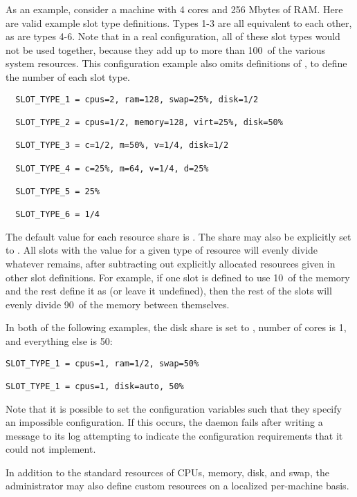 \begin{description}
As an example, consider a
machine with 4 cores and 256 Mbytes of RAM.
Here are valid example slot type definitions. 
Types 1-3 are all equivalent to each other, as are types 4-6.  Note that
in a real configuration, all of these slot types would not
be used together,
because they add up to more than 100\Percent\ of the various system resources.
This configuration example also omits definitions of
, to define the number of each slot type.

\begin{verbatim}
  SLOT_TYPE_1 = cpus=2, ram=128, swap=25%, disk=1/2

  SLOT_TYPE_2 = cpus=1/2, memory=128, virt=25%, disk=50%

  SLOT_TYPE_3 = c=1/2, m=50%, v=1/4, disk=1/2

  SLOT_TYPE_4 = c=25%, m=64, v=1/4, d=25%

  SLOT_TYPE_5 = 25%

  SLOT_TYPE_6 = 1/4
\end{verbatim}

The default value for each resource share is .  The share
may also be explicitly set to .  All slots with the value
 for a given type of resource will evenly divide
whatever remains,
after subtracting out explicitly
allocated resources given in other slot definitions.  
For example, if one slot is
defined to use 10\Percent\ of the memory and the rest define it as
 (or leave it undefined), then the rest of the slots will
evenly divide 90\Percent\ of the memory between themselves.

In both of the following examples, the disk share is set to ,
number of cores is 1, and everything else is 50\Percent:

\begin{verbatim}
SLOT_TYPE_1 = cpus=1, ram=1/2, swap=50%

SLOT_TYPE_1 = cpus=1, disk=auto, 50%
\end{verbatim}

Note that it is possible to set the configuration variables such
that they specify an impossible configuration.
If this occurs, the  daemon fails after writing
a message to its log attempting to indicate the configuration
requirements that it could not implement.

In addition to the standard resources of CPUs, memory, disk, and swap,
the administrator may also define custom resources on 
a localized per-machine basis.


\end{description}
